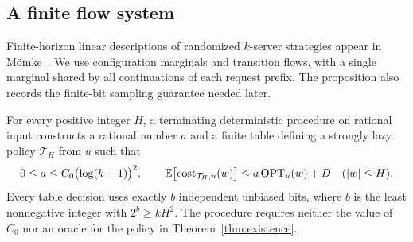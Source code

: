 \subsection{A finite flow system}

Finite-horizon linear descriptions of randomized $k$-server strategies
appear in M\"omke~\cite[Section~4]{Moemke2013}. We use configuration
marginals and transition flows, with a single marginal shared by all
continuations of each request prefix. The proposition also records the
finite-bit sampling guarantee needed later.

\begin{proposition}\label{prop:finite-table}
For every positive integer $H$, a terminating deterministic procedure
on rational input constructs a rational number $a$ and a finite table
defining a strongly lazy policy $\mathcal T_H$ from $u$ such that
\begin{equation}\label{eq:finite-table-bound}
 0\le a\le C_0\bigl(\log(k+1)\bigr)^2,\qquad
 \mathbb E\bigl[\operatorname{cost}_{\mathcal T_H,u}(w)\bigr]
 \le a\operatorname{OPT}_u(w)+D
 \quad (|w|\le H).
\end{equation}
Every table decision uses exactly $b$ independent unbiased bits, where
$b$ is the least nonnegative integer with $2^b\ge kH^2$. The procedure
requires neither the value of $C_0$ nor an oracle for the policy in
Theorem~\ref{thm:existence}.
\end{proposition}

